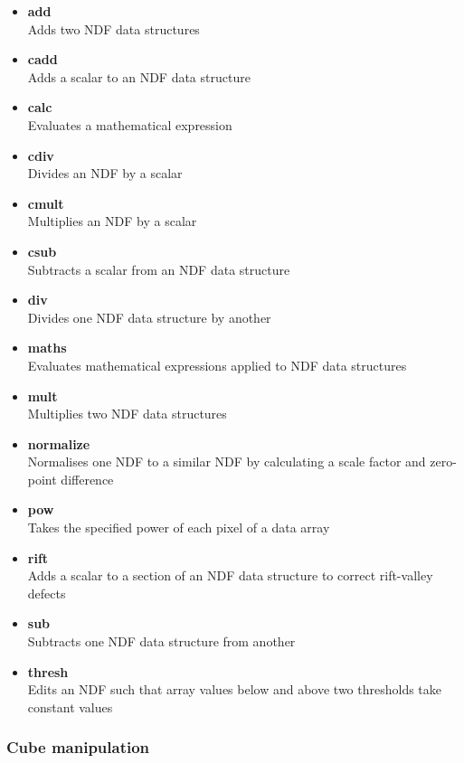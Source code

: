 \documentclass[twoside,11pt]{article}
\newcommand{\xref}[3]{#1}
\begin{document}
{\begin{itemize}
\item{\xref{{\bf add}}{sun95}{ADD}}\\
Adds two NDF data structures 
\item{\xref{{\bf cadd}}{sun95}{CADD}}\\
Adds a scalar to an NDF data structure 
\item{\xref{{\bf calc}}{sun95}{CALC}}\\
Evaluates a mathematical expression  
\item{\xref{{\bf cdiv}}{sun95}{CDIV}}\\
Divides an NDF by a scalar 
\item{\xref{{\bf cmult}}{sun95}{CMULT}}\\
Multiplies an NDF by a scalar 
\item{\xref{{\bf csub}}{sun95}{CSUB}}\\
Subtracts a scalar from an NDF data structure 
\item{\xref{{\bf div}}{sun95}{DIV}}\\
Divides one NDF data structure by another
\item{\xref{{\bf maths}}{sun95}{MATHS}}\\
Evaluates mathematical expressions applied to NDF data structures 
\item{\xref{{\bf mult}}{sun95}{MULT}}\\
Multiplies two NDF data structures 
\item{\xref{{\bf normalize}}{sun95}{NORMALIZE}}\\
Normalises one NDF to a similar NDF by calculating a scale factor and zero-point difference 
\item{\xref{{\bf pow}}{sun95}{POW}}\\ 
Takes the specified power of each pixel of a data array 
\item{\xref{{\bf rift}}{sun95}{RIFT}}\\ 
Adds a scalar to a section of an NDF data structure to correct rift-valley defects 
\item{\xref{{\bf sub}}{sun95}{SUB}}\\
Subtracts one NDF data structure from another 
\item{\xref{{\bf thresh}}{sun95}{THRESH}}\\ 
Edits an NDF such that array values below and above two thresholds take constant values 
\end{itemize}

\subsubsection{Cube manipulation}

}
\end{document}

